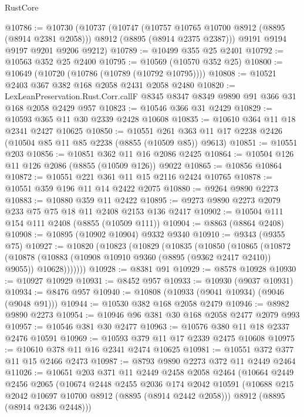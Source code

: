 \begin{lexlean}{RustCore}
\begin{coremodule}
@10786 := @10730
    (@10737
      (@10747
        (@10757 @10765 @10700 @8912 (@8895 (@8914 @2381 @2058)))
        @8912
        (@8895 (@8914 @2375 @2387)))
      @9191
      @9194
      @9197
      @9201
      @9206
      @9212)
@10789 := @10499 @355 @25 @2401
@10792 := @10563 @352 @25 @2400
@10795 := @10569 (@10570 @352 @25)
@10800 := @10649 (@10720 (@10786 (@10789 (@10792 @10795))))
@10808 := @10521 @2403 @367 @382 @168 @2058 @2431 @2058 @2480
@10820 := LexLeanPreservation.Rust.Corr.callF
    @8345
    @8347
    @8349
    @9890
    @91
    @366
    @31
    @168
    @2058
    @2429
    @957
@10823 := @10546 @366 @31 @2429
@10829 := @10593 @365 @11 @30 @2339 @2428 @10608
@10835 := @10610 @364 @11 @18 @2341 @2427 @10625
@10850 := @10551 @261 @363 @11 @17 @2238 @2426 (@10504 @85 @11 @85 @2238 (@8855 (@10509 @85)) @9613)
@10851 := @10551 @203
@10856 := @10851 @362 @11 @16 @2086 @2425
@10864 := @10504 @126 @11 @126 @2086 (@8855 (@10509 @126)) @9022
@10865 := @10856 @10864
@10872 := @10551 @221 @361 @11 @15 @2116 @2424 @10765
@10878 := @10551 @359 @196 @11 @14 @2422 @2075
@10880 := @9264 @9890 @2273
@10883 := @10880 @359 @11 @2422
@10895 := @9273 @9890 @2273 @2079 @233 @75 @75 @18 @11 @2408 @2153 @136 @2417
@10902 := @10504 @111 @154 @111 @2408 (@8855 (@10509 @111))
@10904 := @8863 (@8864 @2408)
@10908 := @10895 (@10902 @10904) @9332 @9340
@10910 := @9343 (@9355 @75)
@10927 := @10820
    (@10823
      (@10829
        (@10835
          (@10850
            (@10865
              (@10872
                (@10878
                  (@10883 (@10908 @10910 @9360 (@8895 (@9362 @2417 @2410)) @9055))
                  @10628)))))))
@10928 := @8381 @91
@10929 := @8578 @10928
@10930 := @10927 @10929
@10931 := @8452 @957
@10933 := @10930 (@9037 @10931)
@10934 := @8476 @957
@10940 := @10808 (@10933 (@9041 @10934) (@9046 (@9048 @91)))
@10944 := @10530 @382 @168 @2058 @2479
@10946 := @8982 @9890 @2273
@10954 := @10946 @96 @381 @30 @168 @2058 @2477 @2079 @993
@10957 := @10546 @381 @30 @2477
@10963 := @10576 @380 @11 @18 @2337 @2476 @10591
@10969 := @10593 @379 @11 @17 @2339 @2475 @10608
@10975 := @10610 @378 @11 @16 @2341 @2474 @10625
@10981 := @10551 @372 @377 @11 @15 @2466 @2473
@10987 := @8793 @9890 @2273 @372 @11 @2449 @2464
@11026 := @10651
    @203
    @371
    @11
    @2449
    @2458
    @2058
    @2464
    (@10664
      @2449
      @2456
      @2065
      (@10674
        @2448
        @2455
        @2036
        @174
        @2042
        @10591
        (@10688 @215 @2042 @10697 @10700 @8912 (@8895 (@8914 @2442 @2058)))
        @8912
        (@8895 (@8914 @2436 @2448)))

\end{coremodule}
\end{lexlean}
